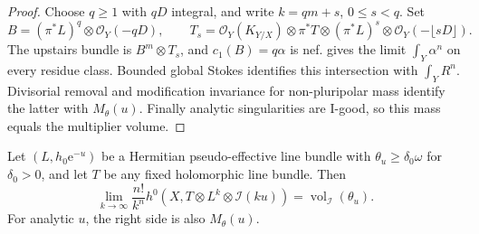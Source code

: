 \begin{proof}
Choose $q\geq1$ with $qD$ integral, and write $k=qm+s$, $0\leq s<q$. Set
\[
 B=(\pi^*L)^q\otimes\mathcal O_Y(-qD),\qquad
 T_s=\mathcal O_Y(K_{Y/X})\otimes\pi^*T
         \otimes(\pi^*L)^s\otimes\mathcal O_Y(-\lfloor sD\rfloor).
\]
The upstairs bundle is $B^m\otimes T_s$, and $c_1(B)=q\alpha$ is nef.  gives the limit $\int_Y\alpha^n$ on every residue class. Bounded global Stokes identifies this intersection with $\int_YR^n$. Divisorial removal and modification invariance for non-pluripolar mass identify the latter with $M_\theta(u)$. Finally analytic singularities are I-good, so this mass equals the multiplier volume.
\end{proof}

\begin{theorem}\label{thm:strict-psh-metric-section-asymptotic}
Let $(L,h_0\mathrm e^{-u})$ be a Hermitian pseudo-effective line bundle with $\theta_u\geq\delta_0\omega$ for $\delta_0>0$, and let $T$ be any fixed holomorphic line bundle. Then
\begin{equation}\label{eq:strict-psh-section-asymptotic}
 \lim_{k\to\infty}\frac{n!}{k^n}
       h^0(X,T\otimes L^k\otimes\mathcal I(ku))
       =\operatorname{vol}_{\mathcal I}(\theta_u).
\end{equation}
For analytic $u$, the right side is also $M_\theta(u)$.
\end{theorem}

